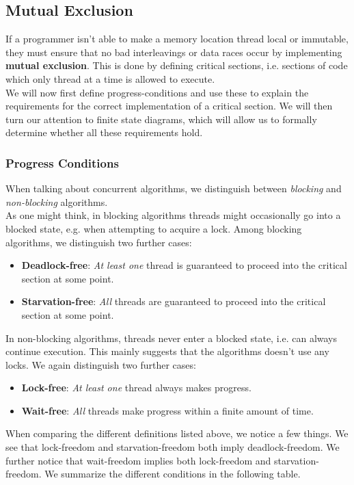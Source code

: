 \documentclass[main]{subfiles}
\begin{document}
\subsection{Mutual Exclusion}
If a programmer isn't able to make a memory location thread local or immutable, they must ensure that no bad interleavings or data races occur by implementing \textbf{mutual exclusion}. This is done by defining critical sections, i.e. sections of code which only thread at a time is allowed to execute.\\[3mm]
We will now first define progress-conditions and use these to explain the requirements for the correct implementation of a critical section. We will then turn our attention to finite state diagrams, which will allow us to formally determine whether all these requirements hold. 

\subsubsection{Progress Conditions}
When talking about concurrent algorithms, we distinguish between \textit{blocking} and \textit{non-blocking} algorithms.\\[3mm]
As one might think, in blocking algorithms threads might occasionally go into a blocked state, e.g. when attempting to acquire a lock. Among blocking algorithms, we distinguish two further cases:
\begin{itemize}
    \item \textbf{Deadlock-free}: \textit{At least one} thread is guaranteed to proceed into the critical section at some point.
    \item \textbf{Starvation-free}: \textit{All} threads are guaranteed to proceed into the critical section at some point.
\end{itemize} 
In non-blocking algorithms, threads never enter a blocked state, i.e. can always continue execution. This mainly suggests that the algorithms doesn't use any locks. We again distinguish two further cases:
\begin{itemize}
    \item \textbf{Lock-free}: \textit{At least one} thread always makes progress.
    \item \textbf{Wait-free}: \textit{All} threads make progress within a finite amount of time.
\end{itemize}
When comparing the different definitions listed above, we notice a few things. We see that lock-freedom and starvation-freedom both imply deadlock-freedom. We further notice that wait-freedom implies both lock-freedom and starvation-freedom. We summarize the different conditions in the following table.
\end{document}
